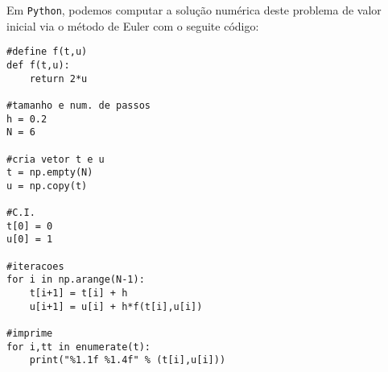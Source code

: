 \begin{ex}
\ifispython
Em \verb+Python+, podemos computar a solução numérica deste problema de valor inicial via o método de Euler com o seguite código:
\begin{verbatim}
#define f(t,u)
def f(t,u):
    return 2*u

#tamanho e num. de passos
h = 0.2
N = 6

#cria vetor t e u
t = np.empty(N)
u = np.copy(t)

#C.I.
t[0] = 0
u[0] = 1

#iteracoes
for i in np.arange(N-1):
    t[i+1] = t[i] + h
    u[i+1] = u[i] + h*f(t[i],u[i])

#imprime
for i,tt in enumerate(t):
    print("%1.1f %1.4f" % (t[i],u[i]))
\end{verbatim}
\fi
\end{ex}

